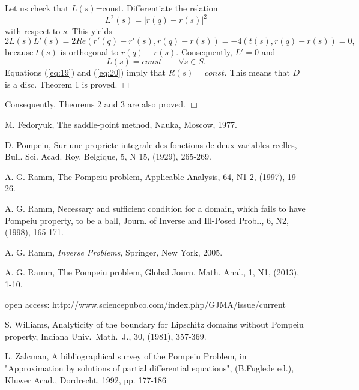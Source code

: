 \documentclass[final,11pt]{article}
\begin{document}
Let us check that $L(s)$=const. Differentiate the relation
$$L^2(s)=|r(q)-r(s)|^2$$
with respect to $s$. This yields
$$2L(s) L'(s)=2 Re (r'(q)-r'(s), r(q)-r(s))=-4(t(s), r(q)-r(s))=0,$$
because $t(s)$ is orthogonal to $r(q)-r(s)$.
Consequently, $L'=0$ and
\begin{equation}\label{eq:20}
L(s)=const \qquad \forall s\in S.
\end{equation}
Equations (\ref{eq:19}) and (\ref{eq:20}) imply that $R(s)=const$.
This means that $D$ is a disc.
Theorem 1 is proved. \hfill $\Box$

Consequently, Theorems 2 and 3 are also proved. \hfill $\Box$


\begin{thebibliography}{00}

 M. Fedoryuk, The saddle-point method, Nauka, Moscow, 1977.

  D. Pompeiu,   Sur une propriete
integrale des fonctions de deux variables reelles,  Bull. Sci. Acad. Roy.
Belgique,  5, N 15, (1929),  265-269.

 A. G. Ramm,  The Pompeiu problem, Applicable Analysis,
64, N1-2,
(1997), 19-26.

 A. G. Ramm,
 Necessary and sufficient condition for a domain, which fails to have
Pompeiu property, to be a ball, Journ. of
Inverse and Ill-Posed Probl., 6, N2, (1998), 165-171.

 A. G. Ramm, {\it Inverse Problems}, Springer, New York,
2005.

 A. G. Ramm, The Pompeiu problem, Global Journ. Math. Anal.,
1, N1, (2013), 1-10.

open access: http://www.sciencepubco.com/index.php/GJMA/issue/current

 S. Williams,
Analyticity of the boundary for Lipschitz
domains without Pompeiu property, Indiana Univ.\ Math.\ J., 30,
(1981), 357-369.

 L. Zalcman,  A bibliographical
survey of the Pompeiu Problem, in "Approximation by solutions of partial
differential equations", (B.Fuglede ed.), Kluwer Acad., Dordrecht, 1992,
 pp. 177-186












\end{thebibliography}
\end{document}
